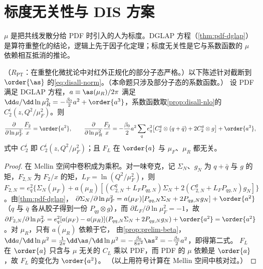 \section{标度无关性与 DIS 方案}\label{sec:disall-scale}

$\mu$ 是把共线发散分给 PDF 时引入的人为标度。DGLAP 方程（\cref{thm:pdf-dglap}）是算符重整化的结论，逻辑上先于因子化定理；标度无关性是它与系数函数的 $\mu$ 依赖相互抵消的推论。

\begin{proposition}\label{prop:disall-scale}
（$R_{\mathrm{PT}}$：在重整化微扰论中对红外正规化的部分子态严格。）以下陈述针对截断到 $\order{\as}$ 的\cref{eq:disall-norm}。（本命题只涉及部分子态的系数函数。）
设 PDF 满足 DGLAP 方程，$a\equiv\as(\mu_R)/2\pi$ 满足 $\dd a/\dd\ln\mu_R^2=-\frac{\beta_0}2a^2+\order{a^3}$，系数函数取\cref{prop:disall-nlo}的 $C_2^i(z,Q^2/\mu_F^2)$。则
\begin{equation}\label{eq:disall-scale}
\frac{\partial}{\partial\ln\mu_F^2}\frac{F_2}x=\order{a^2},\qquad
\frac{\partial}{\partial\ln\mu_R^2}\frac{F_2}x=-\frac{\beta_0}2a^2\sum_qe_q^2\big[C_2^q\otimes(q+\bar q)+2C_2^g\otimes g\big]+\order{a^3},   %
\end{equation}
式中 $C_2^i$ 即 $C_2^i(z,Q^2/\mu_F^2)$；且 $F_L$ 在 $\order{a}$ 与 $\mu_F$、$\mu_R$ 都无关。
\end{proposition}

\begin{proof}
在 Mellin 空间中卷积成为乘积。对一味夸克，记 $\Sigma_N$、$g_N$ 为 $q+\bar q$ 与 $g$ 的矩，$F_{2,N}$ 为 $F_2/x$ 的矩，$L_F=\ln(Q^2/\mu_F^2)$，则
$F_{2,N}=e_q^2\{\Sigma_N(\mu_F)+a(\mu_R)[(C^q_{2,N}+L_FP_{qq,N})\Sigma_N+2(C^g_{2,N}+L_FP_{qg,N})g_N]\}$。由\cref{thm:pdf-dglap}，
$\partial\Sigma_N/\partial\ln\mu_F^2=a(\mu_F)[P_{qq,N}\Sigma_N+2P_{qg,N}g_N]+\order{a^2}$（$q$ 与 $\bar q$ 各从胶子得到一份 $P_{qg}\otimes g$），而 $\partial L_F/\partial\ln\mu_F^2=-1$，故
$\partial F_{2,N}/\partial\ln\mu_F^2=e_q^2[a(\mu_F)-a(\mu_R)](P_{qq,N}\Sigma_N+2P_{qg,N}g_N)+\order{a^2}=\order{a^2}$。对 $\mu_R$，只有 $a(\mu_R)$ 依赖于它，
由\cref{prop:prelim-beta}，$\dd a/\dd\ln\mu^2=\frac1{2\pi}\dd\as/\dd\ln\mu^2=-\frac{\beta_0}{8\pi^2}\as^2=-\frac{\beta_0}2a^2$，即得第二式。
$F_L$ 在 $\order{a}$ 只含与 $\mu$ 无关的 $C_L$ 乘以 PDF，而 PDF 的 $\mu$ 依赖是 $\order{a}$，故 $F_L$ 的变化为 $\order{a^2}$。
（以上用符号计算在 Mellin 空间中核对过。）
\end{proof}

